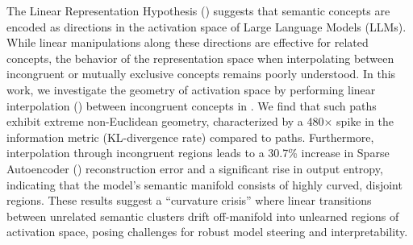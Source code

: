 The Linear Representation Hypothesis (\lrh) suggests that semantic concepts are encoded as directions in the activation space of Large Language Models (LLMs). While linear manipulations along these directions are effective for related concepts, the behavior of the representation space when interpolating between incongruent or mutually exclusive concepts remains poorly understood. In this work, we investigate the geometry of activation space by performing linear interpolation (\lerp) between incongruent concepts in \gpttwo. We find that such paths exhibit extreme non-Euclidean geometry, characterized by a 480$\times$ spike in the information metric (KL-divergence rate) compared to \congruent paths. Furthermore, interpolation through incongruent regions leads to a 30.7\% increase in Sparse Autoencoder (\sae) reconstruction error and a significant rise in output entropy, indicating that the model's semantic manifold consists of highly curved, disjoint regions. These results suggest a ``curvature crisis'' where linear transitions between unrelated semantic clusters drift off-manifold into unlearned regions of activation space, posing challenges for robust model steering and interpretability.
